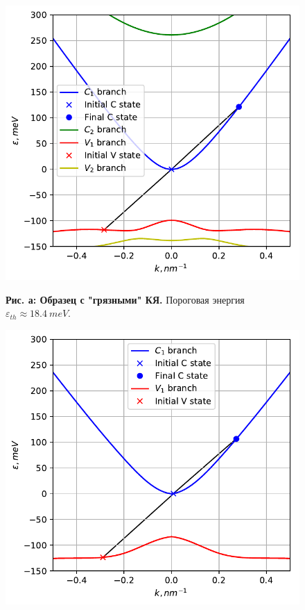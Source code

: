 \documentclass[../main.tex]{subfiles}
\begin{document}
    \begin{figure}[h]
        \begin{minipage}[h]{0.45\linewidth}
            \begin{center}
                \includegraphics[width=1.\linewidth]{./images/main_14u_80K_pic.pdf}

                \textbf{Рис. а: Образец с "грязными" КЯ.} Пороговая энергия 
                    $\varepsilon_{th} \approx 18.4~meV$.
            \end{center}
        \end{minipage}
        \hfill
        \begin{minipage}[h]{0.45\linewidth}
            \begin{center}
                \includegraphics[width=1.\linewidth]{./images/14u_pure_80K.pdf}


\end{center}
\end{minipage}
\end{figure}
\end{document}
